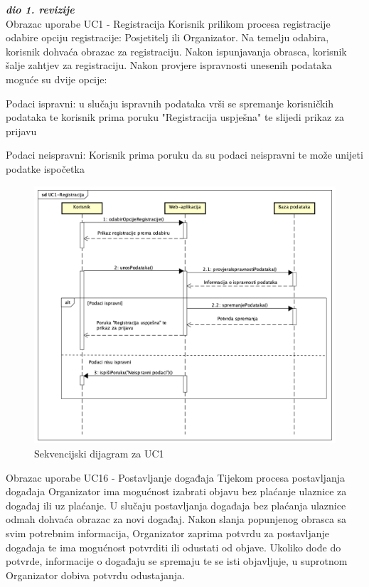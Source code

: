 				\textbf{\textit{dio 1. revizije}}\\
	
				\LARGE {Obrazac uporabe UC1 - Registracija}
				\newline
				\normalsize
				Korisnik prilikom procesa registracije odabire opciju registracije: Posjetitelj ili Organizator. Na temelju odabira, korisnik dohvaća obrazac za registraciju. Nakon ispunjavanja obrasca, korisnik šalje zahtjev za registraciju. Nakon provjere ispravnosti unesenih podataka moguće su dvije opcije:
				
				\begin{packed_item}
					\item {Podaci ispravni:} u slučaju ispravnih podataka vrši se spremanje korisničkih podataka te korisnik prima poruku "Registracija uspješna" te slijedi prikaz za prijavu
					\item {Podaci neispravni:} Korisnik prima poruku da su podaci neispravni te može unijeti podatke ispočetka
				\end{packed_item}
				
				\begin{figure}[H]
					\includegraphics[scale=0.5]{dijagrami/sd-UC1-Registracija.png} %
					\centering
					\caption{Sekvencijski dijagram za UC1}
					\label{fig:promjene}
				\end{figure}
				\eject		
				
				\LARGE {Obrazac uporabe UC16 - Postavljanje događaja}
				\newline
				\normalsize
				Tijekom procesa postavljanja događaja Organizator ima mogućnost izabrati objavu bez plaćanje ulaznice za događaj ili uz plaćanje. U slučaju postavljanja događaja bez plaćanja ulaznice odmah dohvaća obrazac za novi događaj. 
				Nakon slanja popunjenog obrasca sa svim potrebnim informacija, Organizator zaprima potvrdu za postavljanje događaja te ima mogućnost potvrditi ili odustati od objave. Ukoliko dođe do potvrde, informacije o događaju se spremaju te se isti objavljuje, u suprotnom Organizator dobiva potvrdu odustajanja.
				
